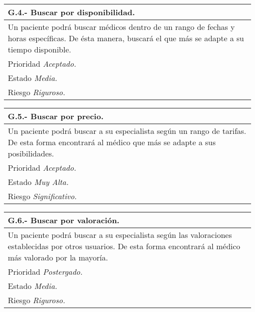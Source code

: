 \documentclass[a4paper,oneside,11pt]{book}
\begin{document}
\begin{center}
\begin{tabulary}{15cm}{|L|}
	\hline
		\bf{G.4.- Buscar por disponibilidad.} \\
	\hline
		Un paciente podrá buscar médicos dentro de un rango de fechas y horas específicas. De ésta manera, buscará el que más se adapte a su tiempo disponible. \\
	\hline
		Prioridad \textit{Aceptado.} \\
	\hline
		Estado \textit{Media.} \\
	\hline
		Riesgo \textit{Riguroso.} \\
	\hline
\end{tabulary}
\end{center}

\begin{center}
\begin{tabulary}{15cm}{|L|}
	\hline
		\bf{G.5.- Buscar por precio.} \\
	\hline
		Un paciente podrá buscar a su especialista según un rango de tarifas. De esta forma encontrará al médico que más se adapte a sus posibilidades. \\
	\hline
		Prioridad \textit{Aceptado.} \\
	\hline
		Estado \textit{Muy Alta.} \\
	\hline
		Riesgo \textit{Significativo.} \\
	\hline
\end{tabulary}
\end{center}

\begin{center}
\begin{tabulary}{15cm}{|L|}
	\hline
		\bf{G.6.- Buscar por valoración.} \\
	\hline
		Un paciente podrá buscar a su especialista según las valoraciones establecidas por otros usuarios. De esta forma encontrará al médico más valorado por la mayoría. \\
	\hline
		Prioridad \textit{Postergado.} \\
	\hline
		Estado \textit{Media.} \\
	\hline
		Riesgo \textit{Riguroso.} \\
	\hline
\end{tabulary}
\end{center}
\end{document}

